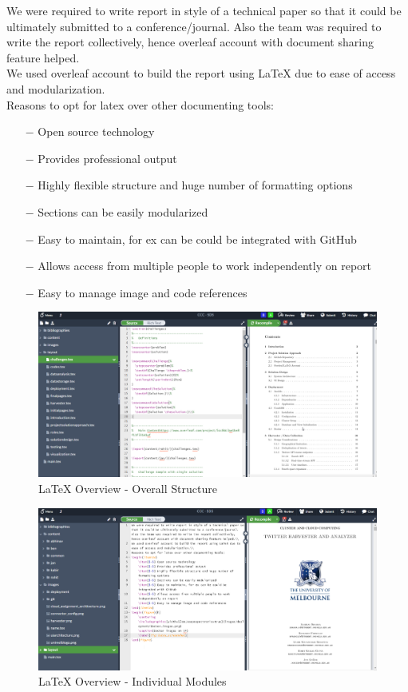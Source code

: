 We were required to write report in style of a technical paper so that it could be ultimately submitted to a conference/journal. Also the team was required to write the report collectively, hence overleaf account with document sharing feature helped.\\
We used overleaf account to build the report using LaTeX due to ease of access and modularization.\\
Reasons to opt for latex over other documenting tools:
\begin{itemize}
    \item[$-$] Open source technology
    \item[$-$] Provides professional output
    \item[$-$] Highly flexible structure and huge number of formatting options
    \item[$-$] Sections can be easily modularized
    \item[$-$] Easy to maintain, for ex can be could be integrated with GitHub
    \item[$-$] Allows access from multiple people to work independently on report
    \item[$-$] Easy to manage image and code references
\end{itemize}

\begin{figure}[H]
    \centering
    \includegraphics[width=14cm,keepaspectratio=true]{images/latex/latex_overview1.png}
    \caption{LaTeX Overview - Overall Structure}
    \label{fig:latex_overview1}
\end{figure}

\begin{figure}[H]
    \centering
    \includegraphics[width=14cm,keepaspectratio=true]{images/latex/latex_overview2.png}
    \caption{LaTeX Overview - Individual Modules}
    \label{fig:latex_overview2}
\end{figure}